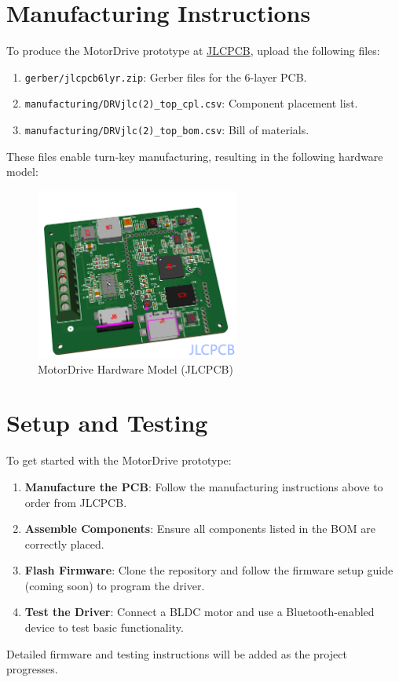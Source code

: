 \documentclass[11pt]{article}
\begin{document}
\section{Manufacturing Instructions}
To produce the MotorDrive prototype at \href{https://jlcpcb.com}{JLCPCB}, upload the following files:
\begin{enumerate}
    \item \texttt{gerber/jlcpcb6lyr.zip}: Gerber files for the 6-layer PCB.
    \item \texttt{manufacturing/DRVjlc(2)\_top\_cpl.csv}: Component placement list.
    \item \texttt{manufacturing/DRVjlc(2)\_top\_bom.csv}: Bill of materials.
\end{enumerate}
These files enable turn-key manufacturing, resulting in the following hardware model:

\begin{figure}[h]
    \centering
    \includegraphics[width=0.6\textwidth]{jlcII.png}
    \caption{MotorDrive Hardware Model (JLCPCB)}
    \label{fig:jlcII}
\end{figure}

\section{Setup and Testing}
To get started with the MotorDrive prototype:
\begin{enumerate}
    \item \textbf{Manufacture the PCB}: Follow the manufacturing instructions above to order from JLCPCB.
    \item \textbf{Assemble Components}: Ensure all components listed in the BOM are correctly placed.
    \item \textbf{Flash Firmware}: Clone the repository and follow the firmware setup guide (coming soon) to program the driver.
    \item \textbf{Test the Driver}: Connect a BLDC motor and use a Bluetooth-enabled device to test basic functionality.
\end{enumerate}
Detailed firmware and testing instructions will be added as the project progresses.
\end{document}
